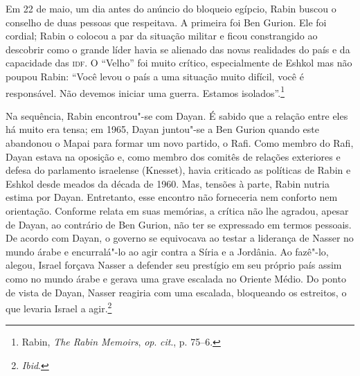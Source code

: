 
Em 22 de maio, um dia antes do anúncio do bloqueio egípcio, Rabin buscou
o conselho de duas pessoas que respeitava. A primeira foi Ben Gurion.
Ele foi cordial; Rabin o colocou a par da situação militar e ficou
constrangido ao descobrir como o grande líder havia se alienado das
novas realidades do país e da capacidade das \textsc{idf}. O ``Velho'' foi muito
crítico, especialmente de Eshkol mas não poupou Rabin: ``Você levou o
país a uma situação muito difícil, você é responsável. Não devemos
iniciar uma guerra. Estamos isolados''.\footnote{Rabin, \textit{The Rabin Memoirs},
\textit{op}. \textit{cit}., p. 75--6.}

Na sequência, Rabin encontrou"-se com Dayan. É sabido que a relação entre eles
há muito era tensa; em 1965, Dayan juntou"-se a Ben Gurion quando
este abandonou o Mapai para formar um novo partido, o Rafi. Como membro
do Rafi, Dayan estava na oposição e, como membro dos comitês de relações
exteriores e defesa do parlamento israelense (Knesset), havia criticado as políticas de Rabin e
Eshkol desde meados da década de 1960. Mas, tensões à parte, Rabin
nutria estima por Dayan. Entretanto, esse encontro não forneceria nem
conforto nem orientação. Conforme relata em suas memórias, a crítica não
lhe agradou, apesar de Dayan, ao contrário de Ben Gurion, não ter se
expressado em termos pessoais. De acordo com Dayan, o governo se
equivocava ao testar a liderança de Nasser no mundo árabe e encurralá"-lo
ao agir contra a Síria e a Jordânia. Ao fazê"-lo, alegou, Israel forçava
Nasser a defender seu prestígio em seu próprio país assim como no mundo
árabe e gerava uma grave escalada no Oriente Médio. Do ponto de vista de
Dayan, Nasser reagiria com uma escalada, bloqueando os estreitos, o que
levaria Israel a agir.\footnote{\textit{Ibid}.}

